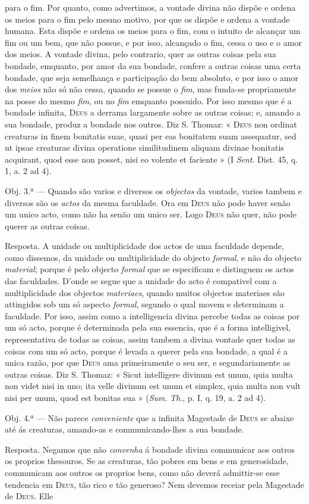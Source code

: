 para o fim. Por quanto, como advertimos, a vontade divina não dispõe e ordena os meios para o fim pelo mesmo motivo, por que os dispõe e ordena a vontade humana. Esta dispõe e ordena os meios para o fim, com o intuito de alcançar um fim ou um bem, que não possue, e por isso, alcançado o fim, cessa o uso e o amor dos meios. A vontade divina, pelo contrario, quer as outras coisas pela sua bondade, emquanto, por amor da sua bondade, confere a outras coisas uma certa bondade, que seja semelhança e participação do bem absoluto, e por isso o amor dos \emph{meios} não só não cessa, quando se possue o \emph{fim}, mas funda-se propriamente na posse do mesmo \emph{fim}, ou no \emph{fim} emquanto possuido. Por isso mesmo que é a bondade infinita, \textsc{Deus} a derrama largamente sobre as outras coisas; e, amando a sua bondade, produz a bondade nos outros. Diz S. Thomaz: « \textsc{Deus} non ordinat creaturas in finem bonitatis suae, quasi per eas bonitatem suam assequatur, sed ut ipsae creaturae divina operatione similitudinem aliquam divinae bonitatis acquirant, quod esse non posset, nisi eo volente et faciente » (I \emph{Sent}. Dist. 45, q. 1, a. 2 ad 4).\par Obj. 3.ª --- Quando são varios e diversos os \emph{objectos} da vontade, varios tambem e diversos são os \emph{actos} da mesma faculdade. Ora em \textsc{Deus} não pode haver senão um unico acto, como não ha senão um unico ser. Logo \textsc{Deus} não quer, não pode querer as outras coisas.\par Resposta. A unidade ou multiplicidade dos actos de uma faculdade depende, como dissemos, da unidade ou multiplicidade do objecto \emph{formal}, e não do objecto \emph{material}; porque é pelo objecto \emph{formal} que se especificam e distinguem os actos das faculdades. D'onde se segue que a unidade do acto é compativel com a multiplicidade dos objectos \emph{materiaes}, quando muitos objectos materiaes são attingidos sob um só aspecto \emph{formal}, segundo o qual movem e determinam a faculdade. Por isso, assim como a intelligencia divina percebe todas as coisas por um só acto, porque é determinada pela sua essencia, que é a forma intelligivel, representativa de todas as coisas, assim tambem a divina vontade quer todas as coisas com um só acto, porque é levada a querer pela sua bondade, a qual é a unica razão, por que \textsc{Deus} ama primeiramente o seu ser, e segundariamente as outras coisas. Diz S. Thomaz: « Sicut intelligere divinum est unum, quia multa non videt nisi in uno; ita velle divinum est unum et simplex, quia multa non vult nisi per unum, quod est bonitas sua » (\emph{Sum}. \emph{Th}., p. I, q. 19, a. 2 ad 4).\par Obj. 4.ª --- Não parece \emph{conveniente} que a infinita Magestade de \textsc{Deus} se abaixe até ás creaturas, amando-as e communicando-lhes a sua bondade.\par Resposta. Negamos que não \emph{convenha} á bondade divina communicar aos outros os proprios thesouros. Se as creaturas, tão pobres em bens e em generosidade, communicam aos outros os proprios bens, como não deverá admittir-se esse tendencia em \textsc{Deus}, tão rico e tão generoso? Nem devemos receiar pela Magestade de \textsc{Deus}. Elle 